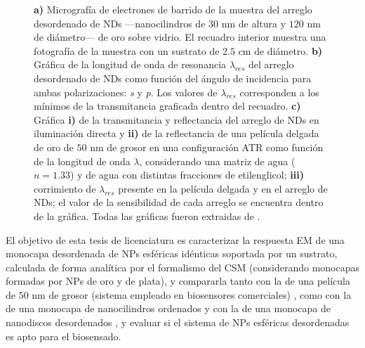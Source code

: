\begin{figure}[t!]
		\caption{ \textbf{a)} Micrografía de electrones de barrido de la muestra del arreglo desordenado de NDs ---nanocilindros de $30$ nm de altura y  $120$ nm de diámetro--- de oro sobre vidrio. El recuadro interior muestra una fotografía de la muestra con un sustrato de $2.5$ cm de diámetro. \textbf{b)} Gráfica de la longitud de onda de resonancia $\lambda_{res}$ del arreglo desordenado de NDs como función del ángulo de incidencia para ambas polarizaciones: \emph{s} y \emph{p}. Los valores de $\lambda_{res}$ corresponden a los mínimos de la transmitancia graficada dentro del recuadro. \textbf{c)} Gráfica \textbf{i)} de la transmitancia y reflectancia del arreglo de NDs en iluminación directa y \textbf{ii)} de la reflectancia de una película delgada de oro de $50$ nm de grosor en una configuración ATR como función de la longitud de onda $\lambda$, considerando una matriz de agua ($n=1.33$) y de agua con distintas fracciones  de etilenglicol; \textbf{iii)} corrimiento de $\lambda_{res}$ presente en la película delgada y en el arreglo de NDs; el valor de la sensibilidad de cada arreglo se encuentra dentro de la gráfica. Todas las gráficas fueron extraidas de \cite{svedendahl2009refractometric}.}\label{fig:GraphsPapersNANODISKS}
	\end{figure} 
 
El objetivo de esta tesis de licenciatura es caracterizar la respuesta EM de una monocapa desordenada de NPs esféricas idénticas soportada por un sustrato, calculada de forma analítica por el formalismo del CSM (considerando monocapas formadas por NPs de oro y de plata), y compararla tanto con la de una película  de $50$ nm de grosor (sistema empleado en biosensores comerciales) \cite{svedendahl2009refractometric}, como con la de una monocapa de nanocilindros ordenados \cite{kabashin2009plasmonic,danilov2018ultra} y con la de una monocapa de nanodiscos desordenados \cite{svedendahl2009refractometric}, y evaluar si el sistema de NPs esféricas desordenadas es apto para el biosensado.

